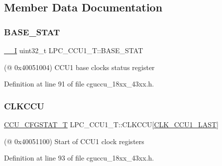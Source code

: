 \subsection{Member Data Documentation}
\mbox{\label{struct_l_p_c___c_c_u1___t_a74e7757a44f17dfe259267a9aab78682}} 
\subsubsection{\texorpdfstring{B\+A\+S\+E\+\_\+\+S\+T\+AT}{BASE\_STAT}}
{\footnotesize\ttfamily \hyperlink{core__sc300_8h_af63697ed9952cc71e1225efe205f6cd3}{\+\_\+\+\_\+I} uint32\+\_\+t L\+P\+C\+\_\+\+C\+C\+U1\+\_\+\+T\+::\+B\+A\+S\+E\+\_\+\+S\+T\+AT}

(@ 0x40051004) C\+C\+U1 base clocks status register 

Definition at line 91 of file cguccu\+\_\+18xx\+\_\+43xx.\+h.

\mbox{\label{struct_l_p_c___c_c_u1___t_aef36abb1875605ca9e9dd52995c040ff}} 
\subsubsection{\texorpdfstring{C\+L\+K\+C\+CU}{CLKCCU}}
{\footnotesize\ttfamily \hyperlink{struct_c_c_u___c_f_g_s_t_a_t___t}{C\+C\+U\+\_\+\+C\+F\+G\+S\+T\+A\+T\+\_\+T} L\+P\+C\+\_\+\+C\+C\+U1\+\_\+\+T\+::\+C\+L\+K\+C\+CU\mbox{[}\hyperlink{chip__clocks_8h_a500a6084ba2d6361fa16b75205a8a513af43f3366ad619d1ac63ac44a6efc0343}{C\+L\+K\+\_\+\+C\+C\+U1\+\_\+\+L\+A\+ST}\mbox{]}}

(@ 0x40051100) Start of C\+C\+U1 clock registers 

Definition at line 93 of file cguccu\+\_\+18xx\+\_\+43xx.\+h.

\mbox{\label{struct_l_p_c___c_c_u1___t_a82e63af1688482d47ba305b4f41794da}} 
